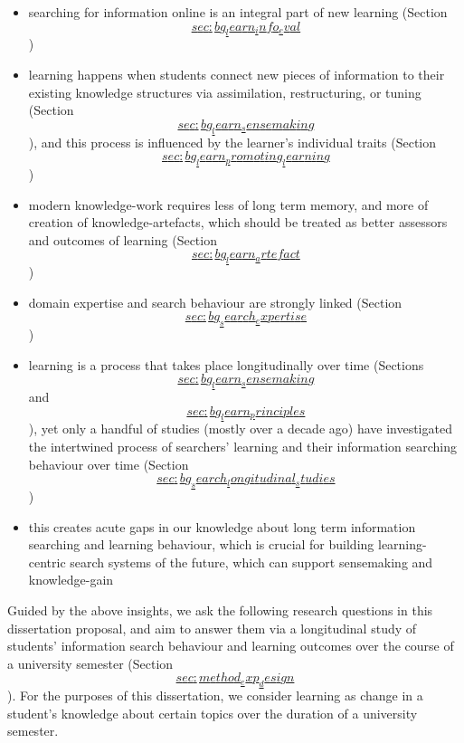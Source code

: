 \documentclass[a4paper, nobind]{templates/ociamthesis}
\begin{document}
\begin{itemize}
\item
  searching for information online is an integral part of new learning
  (Section
  \protect\hyperlink{sec:bg_learn_info_eval}{\[sec:bg_learn_info_eval\]})
\item
  learning happens when students connect new pieces of information to
  their existing knowledge structures via assimilation, restructuring,
  or tuning (Section
  \protect\hyperlink{sec:bg_learn_sensemaking}{\[sec:bg_learn_sensemaking\]}), and this process is
  influenced by the learner's individual traits (Section
  \protect\hyperlink{sec:bg_learn_promoting_learning}{\[sec:bg_learn_promoting_learning\]})
\item
  modern knowledge-work requires less of long term memory, and more of
  creation of knowledge-artefacts, which should be treated as better
  assessors and outcomes of learning (Section
  \protect\hyperlink{sec:bg_learn_artefact}{\[sec:bg_learn_artefact\]})
\item
  domain expertise and search behaviour are strongly linked (Section
  \protect\hyperlink{sec:bg_search_expertise}{\[sec:bg_search_expertise\]})
\item
  learning is a process that takes place longitudinally over time
  (Sections
  \protect\hyperlink{sec:bg_learn_sensemaking}{\[sec:bg_learn_sensemaking\]} and
  \protect\hyperlink{sec:bg_learn_principles}{\[sec:bg_learn_principles\]}), yet only a handful of studies
  (mostly over a decade ago) have investigated the intertwined process
  of searchers' learning and their information searching behaviour
  over time (Section
  \protect\hyperlink{sec:bg_search_longitudinal_studies}{\[sec:bg_search_longitudinal_studies\]})
\item
  this creates acute gaps in our knowledge about long term information
  searching and learning behaviour, which is crucial for building
  learning-centric search systems of the future, which can support
  sensemaking and knowledge-gain
\end{itemize}

Guided by the above insights, we ask the following research questions in
this dissertation proposal, and aim to answer them via a longitudinal
study of students' information search behaviour and learning outcomes
over the course of a university semester (Section
\protect\hyperlink{sec:method_exp_design}{\[sec:method_exp_design\]}). For the purposes of this
dissertation, we consider learning as change in a student's knowledge
about certain topics over the duration of a university semester.
\end{document}
